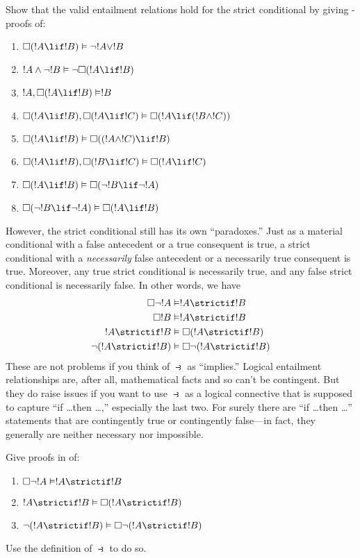 \documentclass[../../../include/open-logic-section]{subfiles}
\begin{document}
\begin{prob}
  Show that the valid entailment relations hold for the strict
  conditional by giving -proofs of:
  \begin{enumerate}
  \item  $\Box(!A \lif !B) \Entails \lnot !A \lor !B$
  \item $!A \land \lnot !B \Entails \lnot\Box(!A \lif !B)$
  \item $!A, \Box(!A \lif !B) \Entails !B$
  \item $\Box(!A \lif !B), \Box(!A \lif !C) \Entails \Box(!A \lif (!B
    \land !C))$
  \item $\Box(!A \lif !B) \Entails \Box((!A \land !C) \lif !B)$
  \item $\Box(!A \lif !B), \Box(!B \lif !C) \Entails \Box(!A
    \lif !C)$
  \item $\Box(!A \lif !B) \Entails \Box(\lnot !B \lif \lnot !A)$
  \item $\Box(\lnot !B \lif \lnot !A) \Entails \Box(!A \lif !B)$
  \end{enumerate}
  \end{prob}

However, the strict conditional still has its own ``paradoxes.'' Just
as a material conditional with a false antecedent or a true consequent
is true, a strict conditional with a \emph{necessarily} false
antecedent or a necessarily true consequent is true. Moreover, any
true strict conditional is necessarily true, and any false strict
conditional is necessarily false. In other words, we have
\begin{align}
  \Box \lnot !A & \Entails !A \strictif !B\\
  \Box !B & \Entails !A \strictif !B\\
  !A \strictif !B& \Entails \Box(!A \strictif !B)\\
  \lnot(!A \strictif !B) & \Entails \Box\lnot(!A \strictif !B)
\end{align}
These are not problems if you think of $\strictif$ as ``implies.''
Logical entailment relationships are, after all, mathematical facts and so
can't be contingent. But they do raise issues if you want to use
$\strictif$ as a logical connective that is supposed to capture ``if
\dots then \dots,'' especially the last two. For surely there are ``if
\dots then \dots'' statements that are contingently true or
contingently false---in fact, they generally are neither necessary nor
impossible.

\begin{prob}
  Give proofs in  of:
  \begin{enumerate}
    \item  $\Box \lnot !A \Entails !A \strictif !B$
    \item $!A \strictif !B \Entails \Box(!A \strictif !B)$
    \item $\lnot(!A \strictif !B)  \Entails \Box\lnot(!A \strictif !B)$
  \end{enumerate}
  Use the definition of $\strictif$ to do so.
\end{prob}
\end{document}

